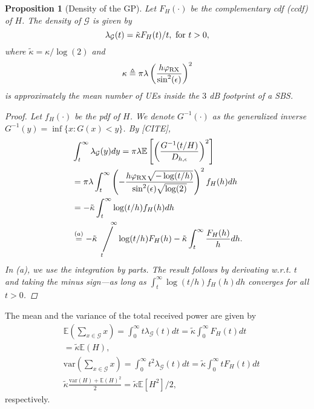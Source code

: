 \documentclass[conference]{IEEEtran}
\newcommand{\viiva}{\mathop{\Bigg/}}
\newcommand{\sij}[3]{\viiva\limits_{\hspace*{-5mm}{#1}}^{\hspace*{5mm}{#2}}{#3}}
\theoremstyle{definition}
\theoremstyle{plain}
\newtheorem{prop}[thm4]{Proposition}
\begin{document}
            \begin{prop}[Density of the GP]
              Let $F_H(\cdot)$ be the complementary cdf (ccdf) of $H$. The density of $\mathcal{G}$ is given by
              \begin{equation}
                \label{eq:GPdensity}
                \lambda_{\mathcal{G}}(t)= \tilde{\kappa}F_H(t)/t, \text{ \text{for} }t>0,
              \end{equation}
              where $\tilde{\kappa}= \kappa/\log(2)$ and
              \begin{equation}
                \label{eq:kappa}
                      {\kappa} \triangleq    \pi \lambda   \left(\frac{h \varphi_{\textup{RX}}}{\sin^2(\epsilon)  }\right)^2
              \end{equation}
              is approximately the mean number of UEs inside the $3$ dB footprint of a SBS.            
              \begin{proof}
                Let $f_H(\cdot)$ be the pdf of $H$. We denote $G^{-1}(\cdot)$ as the generalized inverse $G^{-1}(y) = \inf \{x:G(x)<y\}$. By [CITE],
                \begin{align*}
                  &\int_t^{\infty}\lambda_{\mathcal{G}}(y)dy \overset{}{=} \pi \lambda \mathbb{E}\left[ \left(\frac{G^{-1}(t/H)}{D_{h,\epsilon}}\right)^2 \right] \\
                  &=\pi \lambda \int_t^{\infty} \left(-\frac{h \varphi_{\text{RX}}\sqrt{-\log(t/h)}}{\sin^2(\epsilon) \sqrt{\log(2)}}\right)^2f_H(h) dh  \\
                  &= -\tilde{\kappa} \int_t^{\infty} \log(t/h)f_H(h) dh\\
                  &\overset{(a)}{=} -\tilde{\kappa} \sij{t}{\infty} \log(t/h)F_H(h) - \tilde{\kappa} \int_t^{\infty}\frac{F_H(h)}{h} dh.
                \end{align*}
                In (a), we use the integration by parts. The result follows by derivating w.r.t. $t$ and taking the minus sign---as long as $\int_t^{\infty} \log(t/h)f_H(h) dh$ converges for all $t>0$.
              \end{proof}
            \end{prop}

          The mean and the variance of the total received power are given by
          \begin{align}
            &\mathbb{E}\left(\sum_{x \in \mathcal{G}} x \right) = \int_{0}^{\infty} t\lambda_{\mathcal{G}}(t) dt = \tilde{\kappa} \int_{0}^{\infty}F_H(t) dt \nonumber \\
            &=\tilde{\kappa} \mathbb{E}(H), \\\
            &\text{var}\left(\sum_{x \in \mathcal{G}} x \right) = \int_{0}^{\infty} t^2\lambda_{\mathcal{G}}(t) dt= \tilde{\kappa} \int_0^{\infty}tF_H(t) dt  \nonumber \\
           & \tilde{\kappa} \frac{\text{var}(H) + \mathbb{E}(H)^2}{2} = \tilde{\kappa}  \mathbb{E}[H^2]/2,
          \end{align}
          respectively. 
\end{document}
